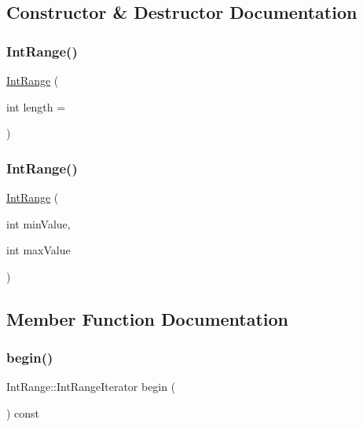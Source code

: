 \subsection{Constructor \& Destructor Documentation}
\mbox{\label{classIntRange_a1371e812388f10db89e8cea0edeec000}} 
\subsubsection{\texorpdfstring{Int\+Range()}{IntRange()}\hspace{0.1cm}{\footnotesize\ttfamily [1/2]}}
{\footnotesize\ttfamily \mbox{\hyperlink{classIntRange}{Int\+Range}} (\begin{DoxyParamCaption}\item[{int}]{length = {} }\end{DoxyParamCaption})}

\mbox{\label{classIntRange_a9e8543f0451b16061adafee2d9ad0f84}} 
\subsubsection{\texorpdfstring{Int\+Range()}{IntRange()}\hspace{0.1cm}{\footnotesize\ttfamily [2/2]}}
{\footnotesize\ttfamily \mbox{\hyperlink{classIntRange}{Int\+Range}} (\begin{DoxyParamCaption}\item[{int}]{min\+Value,  }\item[{int}]{max\+Value }\end{DoxyParamCaption})}



\subsection{Member Function Documentation}
\mbox{\label{classIntRange_a71b24b84d58ec13662a463eddc2e085c}} 
\subsubsection{\texorpdfstring{begin()}{begin()}}
{\footnotesize\ttfamily Int\+Range\+::\+Int\+Range\+Iterator begin (\begin{DoxyParamCaption}{ }\end{DoxyParamCaption}) const}

